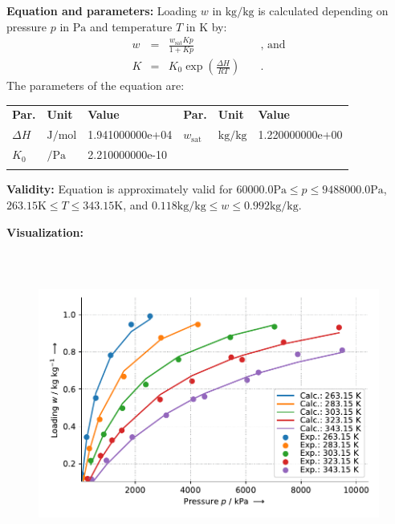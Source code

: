 \textbf{Equation and parameters:}
\newline
%
Loading $w$ in $\si{\kilogram\per\kilogram}$ is calculated depending on pressure $p$ in $\si{\pascal}$ and temperature $T$ in $\si{\kelvin}$ by:
%
\begin{equation*}
\begin{split}
w &=& \frac{w_\mathrm{sat} K p}{1 + K p} & \quad\text{, and} \\
K &=& K_0 \exp \left( \frac{\Delta H}{R T} \right) & \quad\text{.}
\end{split}
\end{equation*}
%
The parameters of the equation are:
%
\begin{longtable}[l]{lll|lll}
\toprule
\addlinespace
\textbf{Par.} & \textbf{Unit} & \textbf{Value} &	\textbf{Par.} & \textbf{Unit} & \textbf{Value} \\
\addlinespace
\midrule
\endhead

\bottomrule
\endfoot
\bottomrule
\endlastfoot
\addlinespace

$\Delta H$ & $\si{\joule\per\mole}$ & 1.941000000e+04 & $w_\mathrm{sat}$ & $\si{\kilogram\per\kilogram}$ & 1.220000000e+00 \\
$K_0$ & $\si{\per\pascal}$ & 2.210000000e-10 & & & \\

\addlinespace\end{longtable}

\textbf{Validity:}
\newline
Equation is approximately valid for $60000.0 \si{\pascal} \leq p \leq 9488000.0 \si{\pascal}$,  $263.15 \si{\kelvin} \leq T \leq 343.15 \si{\kelvin}$, and $0.118 \si{\kilogram\per\kilogram} \leq w \leq 0.992 \si{\kilogram\per\kilogram}$.
\newline

\textbf{Visualization:}
%
\begin{figure}[!htp]
{\noindent\includegraphics[height=10cm, keepaspectratio]{figs/ads/ads_CarbonDioxide_activated_carbon_fiber_A-20_Langmuir_1.pdf}}
\end{figure}
%

